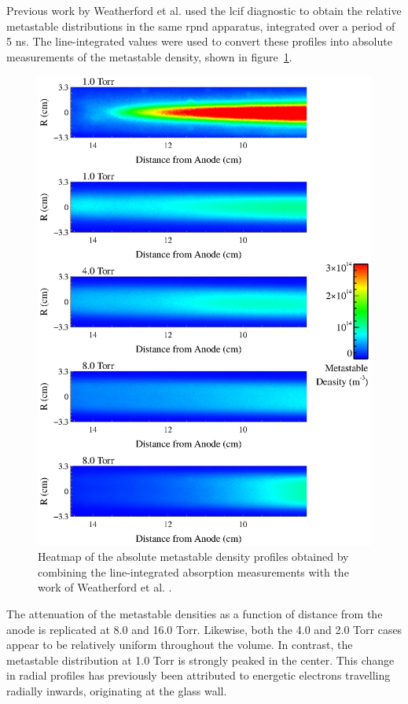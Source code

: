 Previous work by Weatherford et al. \cite{Weatherford2012} used the \acs{lcif}
diagnostic to obtain the relative metastable distributions in the same
\acs{rpnd} apparatus, integrated over a period of 5 ns. The line-integrated
values were used to convert these profiles into absolute measurements of the
metastable density, shown in figure~\ref{fig:profiles}.
\begin{figure}
  \centering
  \includegraphics{./chapters/metastables/figures/profiles.eps}
  \caption{Heatmap of the absolute metastable density profiles obtained by
    combining the line-integrated absorption measurements with the work of
    Weatherford et al. \cite{Weatherford2012}.}
  \label{fig:profiles}
\end{figure}
The attenuation of the metastable densities as a function of distance from the
anode is replicated at 8.0 and 16.0 Torr. Likewise, both the 4.0 and 2.0 Torr
cases appear to be relatively uniform throughout the volume. In contrast, the
metastable distribution at 1.0 Torr is strongly peaked in the center. This
change in radial profiles has previously been attributed to energetic electrons
travelling radially inwards, originating at the glass wall.

